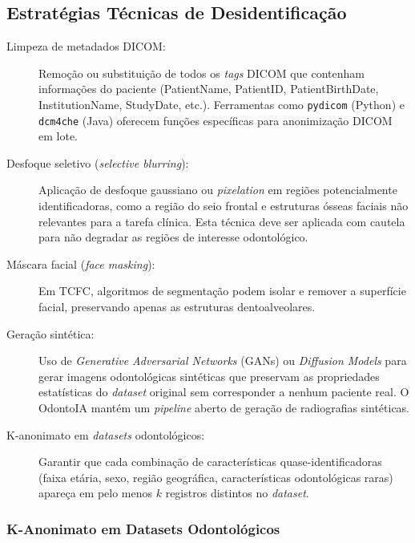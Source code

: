 \subsection{Estratégias Técnicas de Desidentificação}

\begin{description}
  \item[Limpeza de metadados DICOM:] Remoção ou substituição de todos os
    \textit{tags} DICOM que contenham informações do paciente (PatientName,
    PatientID, PatientBirthDate, InstitutionName, StudyDate, etc.). Ferramentas
    como \texttt{pydicom} (Python) e \texttt{dcm4che} (Java) oferecem funções
    específicas para anonimização DICOM em lote.

  \item[Desfoque seletivo (\textit{selective blurring}):] Aplicação de
    desfoque gaussiano ou \textit{pixelation} em regiões potencialmente
    identificadoras, como a região do seio frontal e estruturas ósseas faciais
    não relevantes para a tarefa clínica. Esta técnica deve ser aplicada com
    cautela para não degradar as regiões de interesse odontológico.

  \item[Máscara facial (\textit{face masking}):] Em TCFC, algoritmos de
    segmentação podem isolar e remover a superfície facial, preservando apenas
    as estruturas dentoalveolares.

  \item[Geração sintética:] Uso de \textit{Generative Adversarial Networks}
    (GANs) ou \textit{Diffusion Models} para gerar imagens odontológicas
    sintéticas que preservam as propriedades estatísticas do \textit{dataset}
    original sem corresponder a nenhum paciente real. O OdontoIA mantém um
    \textit{pipeline} aberto de geração de radiografias sintéticas.

  \item[K-anonimato em \textit{datasets} odontológicos:] Garantir que cada
    combinação de características quase-identificadoras (faixa etária, sexo,
    região geográfica, características odontológicas raras) apareça em pelo
    menos $k$ registros distintos no \textit{dataset}.
\end{description}

\subsubsection{K-Anonimato em Datasets Odontológicos}



